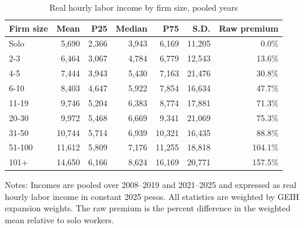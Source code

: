 \begin{table}[htbp]
  \centering
  \caption{Real hourly labor income by firm size, pooled years}
  \label{tab:descriptive-income-size}
  \small
  \begin{tabular}{lrrrrrr}
    \toprule
    Firm size & Mean & P25 & Median & P75 & S.D. & Raw premium \\
    \midrule
    Solo & 5,690 & 2,366 & 3,943 & 6,169 & 11,205 & 0.0\% \\
    2-3 & 6,464 & 3,067 & 4,784 & 6,779 & 12,543 & 13.6\% \\
    4-5 & 7,444 & 3,943 & 5,430 & 7,163 & 21,476 & 30.8\% \\
    6-10 & 8,403 & 4,647 & 5,922 & 7,854 & 16,634 & 47.7\% \\
    11-19 & 9,746 & 5,204 & 6,383 & 8,774 & 17,881 & 71.3\% \\
    20-30 & 9,972 & 5,468 & 6,669 & 9,341 & 21,069 & 75.3\% \\
    31-50 & 10,744 & 5,714 & 6,939 & 10,321 & 16,435 & 88.8\% \\
    51-100 & 11,612 & 5,809 & 7,176 & 11,255 & 18,818 & 104.1\% \\
    101+ & 14,650 & 6,166 & 8,624 & 16,169 & 20,771 & 157.5\% \\
    \bottomrule
  \end{tabular}
  \vspace{0.3em}
  \begin{minipage}{0.95\textwidth}
  \footnotesize
  Notes: Incomes are pooled over 2008--2019 and 2021--2025 and expressed as real hourly labor income in constant 2025 pesos. All statistics are weighted by GEIH expansion weights. The raw premium is the percent difference in the weighted mean relative to solo workers.
  \end{minipage}
\end{table}
